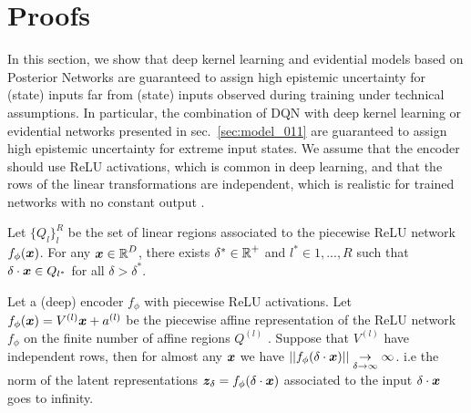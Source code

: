 \appendix


\section{Proofs}
\label{app:proofs}

In this section, we show that deep kernel learning \cite{due} and evidential models based on Posterior Networks \cite{postnet, natpn}  are guaranteed to assign high epistemic uncertainty for (state) inputs far from (state) inputs observed during training under technical assumptions. In particular, the combination of DQN with deep kernel learning or evidential networks presented in sec.~\ref{sec:model_011} are guaranteed to assign high epistemic uncertainty for extreme input states. We assume that the encoder should use ReLU activations, which is common in deep learning, and that the rows of the linear transformations are independent, which is realistic for trained networks with no constant output \citep{overconfident-relu}.

\begin{lemma}
\label{lem:relu-regions_011}
\cite{understanding-nn-relu} Let $\{Q_l\}_l^{R}$ be the set of linear regions associated to the piecewise ReLU network $f_{\phi}(\bm{x})$. For any $\bm{x} \in \operatorname{\mathbb{R}}^D$, there exists $\delta^* \in \operatorname{\mathbb{R}}^{+}$ and $l^*\in {1,..., R}$ such that $\delta \cdot \bm{x} \in Q_{l^*}$ for all $\delta > \delta^*$.
\end{lemma}

\begin{lemma}
\label{lem:asymptotic-latent-norm}
Let a (deep) encoder $f_{\phi}$ with piecewise ReLU activations. Let $f_{\phi}(\bm{x})= V^{(l)}\bm{x} + a^{(l)}$ be the piecewise affine representation of the ReLU network $f_{\phi}$ on the finite number of affine regions $Q^{(l)}$ \citep{understanding-nn-relu}. Suppose that $V^{(l)}$ have independent rows, then for almost any $\bm{x}$ we have $|| f_{\phi}(\delta \cdot \bm{x}) || \underset{\delta \rightarrow \infty}{\rightarrow} \infty$. i.e the norm of the latent representations $\bm{z}_\delta=f_{\phi}(\delta \cdot \bm{x})$ associated to the input $\delta \cdot \bm{x}$ goes to infinity.
\end{lemma}

